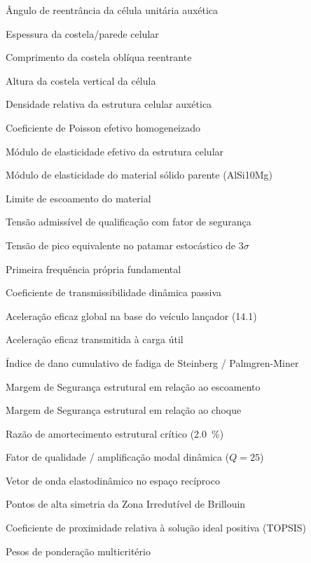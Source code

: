 
\begin{simbolos}
  \item[$\theta$] Ângulo de reentrância da célula unitária auxética
  \item[$t$] Espessura da costela/parede celular
  \item[$l$] Comprimento da costela oblíqua reentrante
  \item[$h$] Altura da costela vertical da célula
  \item[$\rho^* / \rho_s$] Densidade relativa da estrutura celular auxética
  \item[$\nu_{\text{eff}}$] Coeficiente de Poisson efetivo homogeneizado
  \item[$E^*$] Módulo de elasticidade efetivo da estrutura celular
  \item[$E_s$] Módulo de elasticidade do material sólido parente (AlSi10Mg)
  \item[$\sigma_y$] Limite de escoamento do material
  \item[$\sigma_{\text{adm}}$] Tensão admissível de qualificação com fator de segurança
  \item[$\sigma_{3\sigma}$] Tensão de pico equivalente no patamar estocástico de $3\sigma$
  \item[$f_1$] Primeira frequência própria fundamental
  \item[$T$] Coeficiente de transmissibilidade dinâmica passiva
  \item[$G_{\text{rms, base}}$] Aceleração eficaz global na base do veículo lançador (\SI{14.1}{\Grms})
  \item[$G_{\text{rms, payload}}$] Aceleração eficaz transmitida à carga útil
  \item[$D$] Índice de dano cumulativo de fadiga de Steinberg / Palmgren-Miner
  \item[$MS_{\text{yield}}$] Margem de Segurança estrutural em relação ao escoamento
  \item[$MS_{\text{shock}}$] Margem de Segurança estrutural em relação ao choque
  \item[$\zeta$] Razão de amortecimento estrutural crítico (\SI{2.0}{\percent})
  \item[$Q$] Fator de qualidade / amplificação modal dinâmica ($Q = 25$)
  \item[$\mathbf{k}$] Vetor de onda elastodinâmico no espaço recíproco
  \item[$\Gamma, \mathrm{X}, \mathrm{M}$] Pontos de alta simetria da Zona Irredutível de Brillouin
  \item[$C_i^*$] Coeficiente de proximidade relativa à solução ideal positiva (TOPSIS)
  \item[$w_i$] Pesos de ponderação multicritério
\end{simbolos}
